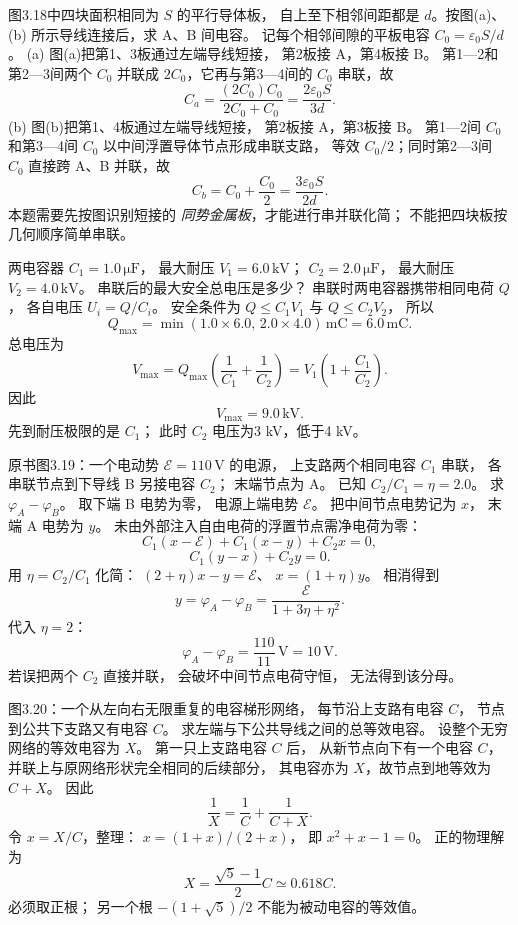 图3.18中四块面积相同为 $S$ 的平行导体板，
自上至下相邻间距都是 $d$。按图(a)、(b)
所示导线连接后，求 A、B 间电容。
\exsolution
记每个相邻间隙的平板电容
$C_0=\varepsilon_0S/d$。
(a) 图(a)把第1、3板通过左端导线短接，
第2板接 A，第4板接 B。
第1—2和第2—3间两个 $C_0$
并联成 $2C_0$，它再与第3—4间的
$C_0$ 串联，故
\[
\boxed{C_a=
\frac{(2C_0)C_0}{2C_0+C_0}
=\frac{2\varepsilon_0S}{3d}}.
\]
(b) 图(b)把第1、4板通过左端导线短接，
第2板接 A，第3板接 B。
第1—2间 $C_0$ 和第3—4间 $C_0$
以中间浮置导体节点形成串联支路，
等效 $C_0/2$；同时第2—3间
$C_0$ 直接跨 A、B 并联，故
\[
\boxed{C_b=C_0+\frac{C_0}{2}
=\frac{3\varepsilon_0S}{2d}}.
\]
\excheck 本题需要先按图识别短接的
\emph{同势金属板}，才能进行串并联化简；
不能把四块板按几何顺序简单串联。

两电容器 $C_1=1.0\,\mathrm{\mu F}$，
最大耐压 $V_1=6.0\,\mathrm{kV}$；
$C_2=2.0\,\mathrm{\mu F}$，
最大耐压 $V_2=4.0\,\mathrm{kV}$。
串联后的最大安全总电压是多少？
\exsolution
串联时两电容器携带相同电荷 $Q$，
各自电压 $U_i=Q/C_i$。
安全条件为
$Q\le C_1V_1$ 与 $Q\le C_2V_2$，
所以
\[
Q_{\max}=\min(1.0\times6.0,\,
2.0\times4.0)\,\mathrm{mC}
=6.0\,\mathrm{mC}.
\]
总电压为
\[
V_{\max}=Q_{\max}
\left(\frac1{C_1}+\frac1{C_2}\right)
=V_1\left(1+\frac{C_1}{C_2}\right).
\]
因此
\[
\boxed{V_{\max}=9.0\,\mathrm{kV}}.
\]
\excheck 先到耐压极限的是 $C_1$；
此时 $C_2$ 电压为3 kV，低于4 kV。

原书图3.19：一个电动势
$\mathcal E=110\,\mathrm V$ 的电源，
上支路两个相同电容 $C_1$ 串联，
各串联节点到下导线 B 另接电容 $C_2$；
末端节点为 A。
已知 $C_2/C_1=\eta=2.0$。
求 $\varphi_A-\varphi_B$。
\exsolution
取下端 B 电势为零，
电源上端电势 $\mathcal E$。
把中间节点电势记为 $x$，
末端 A 电势为 $y$。
未由外部注入自由电荷的浮置节点需净电荷为零：
\[
C_1(x-\mathcal E)+C_1(x-y)+C_2x=0,
\]
\[
C_1(y-x)+C_2y=0.
\]
用 $\eta=C_2/C_1$ 化简：
$(2+\eta)x-y=\mathcal E$、
$x=(1+\eta)y$。
相消得到
\[
\boxed{y=\varphi_A-\varphi_B=
\frac{\mathcal E}{1+3\eta+\eta^2}}.
\]
代入 $\eta=2$：
\[
\boxed{\varphi_A-\varphi_B=
\frac{110}{11}\,\mathrm V=10\,\mathrm V}.
\]
\excheck 若误把两个 $C_2$ 直接并联，
会破坏中间节点电荷守恒，
无法得到该分母。

图3.20：一个从左向右无限重复的电容梯形网络，
每节沿上支路有电容 $C$，
节点到公共下支路又有电容 $C$。
求左端与下公共导线之间的总等效电容。
\exsolution
设整个无穷网络的等效电容为 $X$。
第一只上支路电容 $C$ 后，
从新节点向下有一个电容 $C$，
并联上与原网络形状完全相同的后续部分，
其电容亦为 $X$，故节点到地等效为 $C+X$。
因此
\[
\frac1X=\frac1C+\frac1{C+X}.
\]
令 $x=X/C$，整理：
$x=(1+x)/(2+x)$，
即
$x^2+x-1=0$。
正的物理解为
\[
\boxed{X=\frac{\sqrt5-1}{2}C\simeq0.618C}.
\]
\excheck 必须取正根；
另一个根 $-(1+\sqrt5)/2$ 不能为被动电容的等效值。

